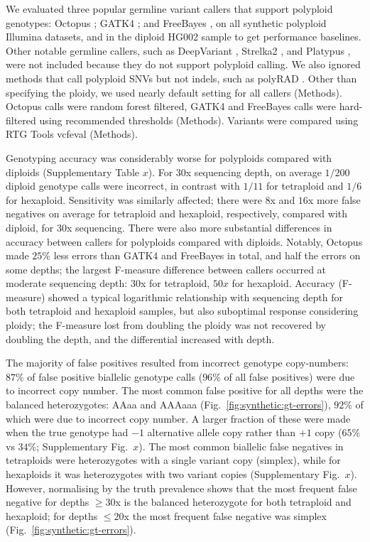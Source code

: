 \documentclass[notitlepage, twocolumn, 10pt]{article}
\begin{document}
We evaluated three popular germline variant callers that support polyploid genotypes: Octopus \cite{RN663}; GATK4 \cite{RN598}; and FreeBayes \cite{RN538}, on all synthetic polyploid Illumina datasets, and in the diploid HG002 sample to get performance baselines. Other notable germline callers, such as DeepVariant \cite{RN619}, Strelka2 \cite{RN604}, and Platypus \cite{RN5}, were not included because they do not support polyploid calling. We also ignored methods that  call polyploid SNVs but not indels, such as polyRAD \cite{RN662}. Other than specifying the ploidy, we used nearly default setting for all callers (Methods). Octopus calls were random forest filtered, GATK4 and FreeBayes calls were hard-filtered using recommended thresholds (Methods). Variants were compared using RTG Tools \cite{RN169} vcfeval (Methods).

Genotyping accuracy was considerably worse for polyploids compared with diploids (Supplementary Table $x$). For $30$x sequencing depth, on average $1/200$ diploid genotype calls were incorrect, in contrast with $1/11$ for tetraploid and $1/6$ for hexaploid. Sensitivity was similarly affected; there were $8$x and $16$x more false negatives on average for tetraploid and hexaploid, respectively, compared with diploid, for $30$x sequencing. There were also more substantial differences in accuracy between callers for polyploids compared with diploids. Notably, Octopus made $25\%$ less errors than GATK4 and FreeBayes in total, and half the errors on some depths; the largest F-measure difference between callers occurred at moderate sequencing depth: $30$x for tetraploid, $50x$ for hexaploid. Accuracy (F-measure) showed a typical logarithmic relationship with sequencing depth for both tetraploid and hexaploid samples, but also suboptimal response considering ploidy; the F-measure lost from doubling the ploidy was not recovered by doubling the depth, and the differential increased with depth.

The majority of false positives resulted from incorrect genotype copy-numbers: $87\%$ of false positive biallelic genotype calls ($96\%$ of all false positives) were due to incorrect copy number. The most common false positive for all depths were the balanced heterozygotes: AAaa and AAAaaa (Fig.\ \ref{fig:synthetic:gt-errors}), $92\%$ of which were due to incorrect copy number. A larger fraction of these were made when the true genotype had $-1$ alternative allele copy rather than $+1$ copy ($65\%$ vs $34\%$; Supplementary Fig.\ $x$). The most common biallelic false negatives in tetraploids were heterozygotes with a single variant copy (simplex), while for hexaploids it was heterozygotes with two variant copies (Supplementary Fig.\ $x$). However, normalising by the truth prevalence shows that the most frequent false negative for depths $\ge 30$x is the balanced heterozygote for both tetraploid and hexaploid; for depths $\le 20$x the most frequent false negative was simplex (Fig.\ \ref{fig:synthetic:gt-errors}).
\end{document}
